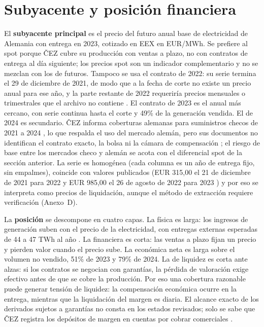 \documentclass[11pt,letterpaper]{article}
\theoremstyle{plain}
\theoremstyle{definition}
\theoremstyle{remark}
\numberwithin{equation}{section}
\begin{document}
\section{Subyacente y posición financiera}

El \textbf{subyacente principal} es el precio del futuro anual base de electricidad de 
Alemania con entrega en 2023, cotizado en EEX en EUR/MWh. Se prefiere al spot porque ČEZ 
cubre su producción con ventas a plazo, no con contratos de entrega al día siguiente; 
los precios spot son un indicador complementario y no se mezclan con los de futuros. 
Tampoco se usa el contrato de 2022: su serie termina el 29 de diciembre de 2021, 
de modo que a la fecha de corte no existe un precio anual para ese año, y 
la parte restante de 2022 requeriría precios mensuales o trimestrales que el archivo 
no contiene . El contrato de 2023 es el anual más cercano, con serie continua hasta el 
corte y 49\% de la generación vendida. El de 2024 es secundario. ČEZ informa coberturas 
alemanas para suministros checos de 2021 a 2024 \parencite{cez_q2_2021}, lo que respalda 
el uso del mercado alemán, pero sus documentos no identifican el contrato exacto, la bolsa 
ni la cámara de compensación ; el riesgo de base entre los mercados checo y alemán se acota 
con el diferencial spot de la sección anterior. La serie es homogénea (cada columna es 
un año de entrega fijo, sin empalmes), coincide con valores publicados (EUR 315,00 el 
21 de diciembre de 2021 para 2022 \parencite{platts_2021_dec} y EUR 985,00 el 
26 de agosto de 2022 para 2023 \parencite{eex_2022}) y por eso se interpreta como precios de
 liquidación, aunque el método de extracción requiere verificación (Anexo~D).

La \textbf{posición} se descompone en cuatro capas. La física es larga: 
los ingresos de generación suben con el precio de la electricidad, con entregas 
externas esperadas de 44 a 47 TWh al año \parencite{cez_q3_2021}. La financiera es corta: 
las ventas a plazo fijan un precio y pierden valor cuando el precio sube. 
La económica neta es larga sobre el volumen no vendido, 51\% de 2023 y 79\% de 2024. 
La de liquidez es corta ante alzas: si los contratos se negocian con garantías, 
la pérdida de valoración exige efectivo antes de que se cobre la producción. 
Por eso una cobertura razonable puede generar tensión de liquidez: la compensación 
económica ocurre en la entrega, mientras que la liquidación del margen es diaria. 
El alcance exacto de los derivados sujetos a garantías no consta en los estados revisados; 
solo se sabe que ČEZ registra los depósitos de margen en cuentas por cobrar comerciales 
\parencite[p.~16]{GIANNOZZI2026107700}.
\end{document}
